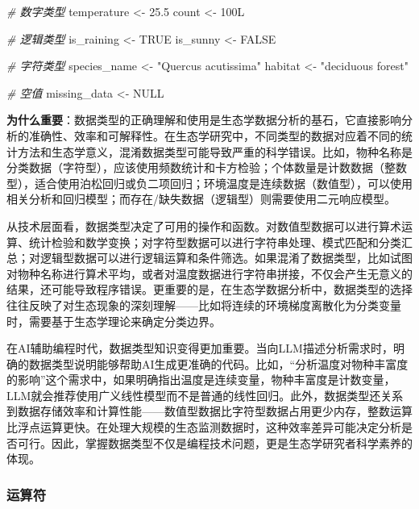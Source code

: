 \documentclass[
]{book}
\newenvironment{Shaded}{\begin{snugshade}}{\end{snugshade}}
\newcommand{\CommentTok}[1]{\textcolor[rgb]{0.56,0.35,0.01}{\textit{#1}}}
\newcommand{\ConstantTok}[1]{\textcolor[rgb]{0.56,0.35,0.01}{#1}}
\newcommand{\DataTypeTok}[1]{\textcolor[rgb]{0.13,0.29,0.53}{#1}}
\newcommand{\DecValTok}[1]{\textcolor[rgb]{0.00,0.00,0.81}{#1}}
\newcommand{\FloatTok}[1]{\textcolor[rgb]{0.00,0.00,0.81}{#1}}
\newcommand{\NormalTok}[1]{#1}
\newcommand{\OtherTok}[1]{\textcolor[rgb]{0.56,0.35,0.01}{#1}}
\newcommand{\StringTok}[1]{\textcolor[rgb]{0.31,0.60,0.02}{#1}}
\begin{document}
\begin{Shaded}
\begin{Highlighting}[]
\CommentTok{\# 数字类型}
\NormalTok{temperature }\OtherTok{\textless{}{-}} \FloatTok{25.5}
\NormalTok{count }\OtherTok{\textless{}{-}} \DecValTok{100}\DataTypeTok{L}

\CommentTok{\# 逻辑类型}
\NormalTok{is\_raining }\OtherTok{\textless{}{-}} \ConstantTok{TRUE}
\NormalTok{is\_sunny }\OtherTok{\textless{}{-}} \ConstantTok{FALSE}

\CommentTok{\# 字符类型}
\NormalTok{species\_name }\OtherTok{\textless{}{-}} \StringTok{"Quercus acutissima"}
\NormalTok{habitat }\OtherTok{\textless{}{-}} \StringTok{"deciduous forest"}

\CommentTok{\# 空值}
\NormalTok{missing\_data }\OtherTok{\textless{}{-}} \ConstantTok{NULL}
\end{Highlighting}
\end{Shaded}

\textbf{为什么重要}：数据类型的正确理解和使用是生态学数据分析的基石，它直接影响分析的准确性、效率和可解释性。在生态学研究中，不同类型的数据对应着不同的统计方法和生态学意义，混淆数据类型可能导致严重的科学错误。比如，物种名称是分类数据（字符型），应该使用频数统计和卡方检验；个体数量是计数数据（整数型），适合使用泊松回归或负二项回归；环境温度是连续数据（数值型），可以使用相关分析和回归模型；而存在/缺失数据（逻辑型）则需要使用二元响应模型。

从技术层面看，数据类型决定了可用的操作和函数。对数值型数据可以进行算术运算、统计检验和数学变换；对字符型数据可以进行字符串处理、模式匹配和分类汇总；对逻辑型数据可以进行逻辑运算和条件筛选。如果混淆了数据类型，比如试图对物种名称进行算术平均，或者对温度数据进行字符串拼接，不仅会产生无意义的结果，还可能导致程序错误。更重要的是，在生态学数据分析中，数据类型的选择往往反映了对生态现象的深刻理解------比如将连续的环境梯度离散化为分类变量时，需要基于生态学理论来确定分类边界。

在AI辅助编程时代，数据类型知识变得更加重要。当向LLM描述分析需求时，明确的数据类型说明能够帮助AI生成更准确的代码。比如，``分析温度对物种丰富度的影响''这个需求中，如果明确指出温度是连续变量，物种丰富度是计数变量，LLM就会推荐使用广义线性模型而不是普通的线性回归。此外，数据类型还关系到数据存储效率和计算性能------数值型数据比字符型数据占用更少内存，整数运算比浮点运算更快。在处理大规模的生态监测数据时，这种效率差异可能决定分析是否可行。因此，掌握数据类型不仅是编程技术问题，更是生态学研究者科学素养的体现。

\hypertarget{ux8fd0ux7b97ux7b26}{%
\subsubsection{运算符}\label{ux8fd0ux7b97ux7b26}}
\end{document}
